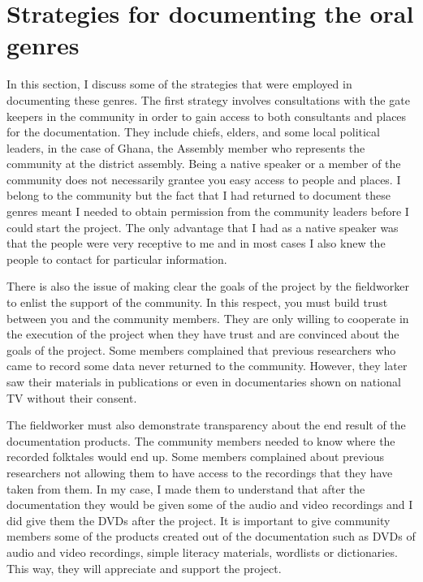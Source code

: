 \documentclass[output=paper,colorlinks,citecolor=brown]{langscibook}
\begin{document}
\section{Strategies for documenting the oral genres}\label{sec:atintono:6}

In this section, I discuss some of the strategies that were employed in documenting these genres. The first strategy involves consultations with the gate keepers in the community in order to gain access to both consultants and places for the documentation. They include chiefs, elders,  and some local political leaders,  in the case of Ghana, the Assembly member who represents the community at the district assembly. Being a native speaker or a member of the community does not necessarily grantee you easy access to people and places. I belong to the community but the fact that I had returned to document these genres meant I needed to obtain permission from the community leaders before I could start the project. The only advantage that I had as a native speaker was that the people were very receptive to me and in most cases I also knew the people to contact for particular information. 

There is also the issue of making clear the goals of the project by the fieldworker to enlist the support of the community. In this respect, you must build trust between you and the community members. They are only willing to cooperate in the execution of the project when they have trust and are convinced about the goals of the project. Some members complained that previous researchers who came to record some data never returned to the community. However, they later saw their materials in publications or even in documentaries shown on national TV without their consent.

The fieldworker must also demonstrate transparency about the end result of the documentation products. The community members needed to know where the recorded folktales would end up. Some members complained about previous researchers not allowing them to have access to the recordings that they have taken from them. In my case, I made them to understand that after the documentation they would be given some of the audio and video recordings and I did give them the DVDs after the project. It is important to give community members some of the products created out of the documentation such as DVDs of audio and video recordings, simple literacy materials, wordlists or dictionaries. This way, they will appreciate and support the project.
\end{document}
